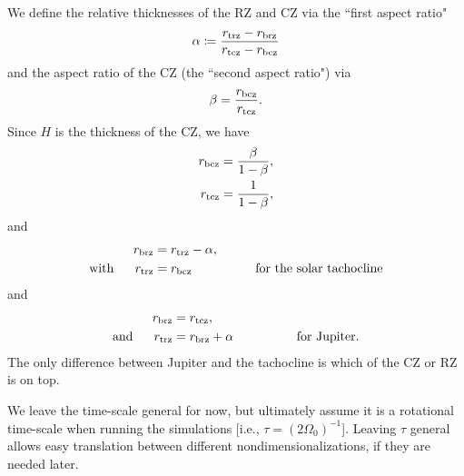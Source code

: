 \documentclass[12pt]{article}
\numberwithin{equation}{section}
\begin{document}
	We define the relative thicknesses of the RZ and CZ via the ``first aspect ratio"
	\begin{align}\label{eq:alpha}
		\alpha\coloneqq \frac{r_{\rm trz}-r_{\rm brz}}{r_{\rm tcz}-r_{\rm bcz}}
	\end{align}
	and the aspect ratio of the CZ (the ``second aspect ratio") via 
	\begin{align}\label{eq:beta}
		\beta = \frac{r_{\rm bcz}}{r_{\rm tcz}}.
	\end{align}
	 Since $H$ is the thickness of the CZ, we have 
	 \begin{subequations}
	 \begin{align}
	 	r_{\rm bcz} &= \frac{\beta}{1-\beta},\\
	 	r_{\rm tcz} &= \frac{1}{1-\beta},
	 \end{align}
	\end{subequations}
	and 
	 \begin{subequations}
	\begin{align}
		r_{\rm brz} &=r_{\rm trz} - \alpha,\\
		\text{with}\ \ \ \ \  r_{\rm trz} &= r_{\rm bcz}\ \ \ \ \ \ \ \ \ \ \ \ \ \ \ \text{for the solar tachocline}
	\end{align}
\end{subequations}
	and
	 \begin{subequations}
	\begin{align}
		r_{\rm brz} &=r_{\rm tcz} ,\\
		\text{and}\ \ \ \ \  r_{\rm trz} &= r_{\rm brz} + \alpha \ \ \ \ \ \ \ \ \ \ \ \ \ \ \ \text{for Jupiter.}
	\end{align}
\end{subequations}
The only difference between Jupiter and the tachocline is which of the CZ or RZ is on top. 

We leave the time-scale general for now, but ultimately assume it is a rotational time-scale when running the simulations [i.e., $\tau=(2\Omega_0)^{-1}$]. Leaving $\tau$ general allows easy translation between different nondimensionalizations, if they are needed later. %
	
\end{document}
